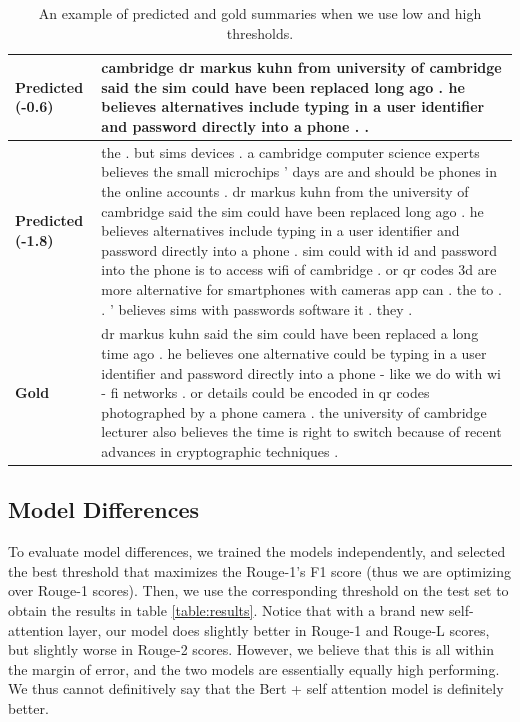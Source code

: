 \documentclass[11pt,a4paper]{article}
\begin{document}
 \begin{table}[t!]
	\centering
	\begin{tabular}{@{}|l|l|@{}}
		\hline
		\textbf{Predicted (-0.6)} & 
		\begin{minipage}{5in}
			cambridge dr markus kuhn from university of cambridge said the sim could have been replaced long ago . he believes alternatives include typing in a user identifier and password directly into a phone . .
		\end{minipage}\\ \hline
		\textbf{Predicted (-1.8)} & 
		\begin{minipage}{5in}
			the . but sims devices . a cambridge computer science experts believes the small microchips ' days are and should be phones in the online accounts . dr markus kuhn from the university of cambridge said the sim could have been replaced long ago . he believes alternatives include typing in a user identifier and password directly into a phone . sim could with id and password into the phone is to access wifi of cambridge . or qr codes 3d are more alternative for smartphones with cameras app can . the to . . ' believes sims with passwords software it . they .
		\end{minipage}\\ \hline
		\textbf{Gold} &
		\begin{minipage}{5in}
			dr markus kuhn said the sim could have been replaced a long time ago . he believes one alternative could be typing in a user identifier and password directly into a phone - like we do with wi - fi networks . or details could be encoded in qr codes photographed by a phone camera . the university of cambridge lecturer also believes the time is right to switch because of recent advances in cryptographic techniques .
		\end{minipage}\\ \hline
	\end{tabular}
	\caption{An example of predicted and gold summaries when we use low and high thresholds.}
	\label{table:threshold-examples}
\end{table}

\subsection{Model Differences}
To evaluate model differences, we trained the models independently, and selected the best threshold that maximizes the Rouge-1's F1 score (thus we are optimizing over Rouge-1 scores). Then, we use the corresponding threshold on the test set to obtain the results in table \ref{table:results}. Notice that with a brand new self-attention layer, our model does slightly better in Rouge-1 and Rouge-L scores, but slightly worse in Rouge-2 scores. However, we believe that this is all within the margin of error, and the two models are essentially equally high performing. We thus cannot definitively say that the Bert + self attention model is definitely better.
\end{document}
